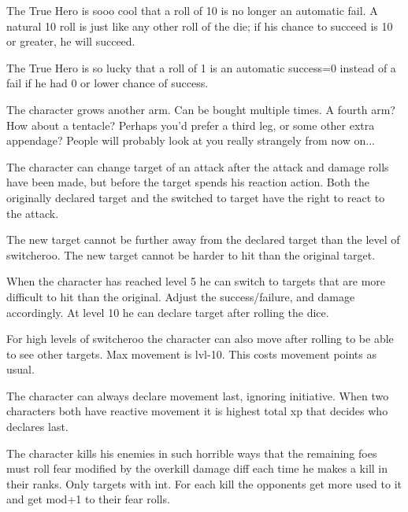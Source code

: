  The True Hero is sooo cool that a roll of 10 is no longer an automatic fail. A natural 10 roll is just like any other roll of the die; if his chance to succeed is 10 or greater, he will succeed.


 The True Hero is so lucky that a roll of 1 is an automatic success=0 instead of a fail if he had 0 or lower chance of success.


 The character grows another arm. Can be bought multiple times. A fourth arm? How about a tentacle? Perhaps you'd prefer a third leg, or some other extra appendage? People will probably look at you really strangely from now on...


 The character can change target of an attack after the attack and damage rolls have been made, but before the target spends his reaction action. Both the originally declared target and the switched to target have the right to react to the attack.

The new target cannot be further away from the declared target than the level of switcheroo. The new target cannot be harder to hit than the original target.

When the character has reached level 5 he can switch to targets that are more difficult to hit than the original. Adjust the success/failure, and damage accordingly. At level 10 he can declare target after rolling the dice.

For high levels of switcheroo the character can also move after rolling to be able to see other targets. Max movement is lvl-10. This costs movement points as usual.


 The character can always declare movement last, ignoring initiative. When two characters both have reactive movement it is highest total xp that decides who declares last.


 The character kills his enemies in such horrible ways that the remaining foes must roll fear modified by the overkill damage diff each time he makes a kill in their ranks. Only targets with int. For each kill the opponents get more used to it and get mod+1 to their fear rolls.




